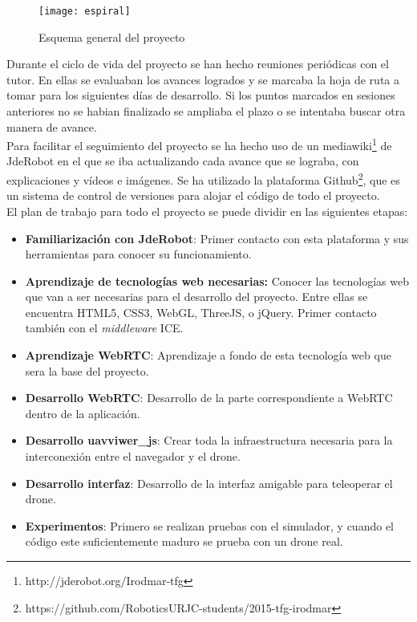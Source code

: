 \begin{figure}[htb]
\centering
\texttt{[image: espiral]}
\caption{Esquema general del proyecto}
\label{fig:planificacion_espiral}
\end{figure}

Durante el ciclo de vida del proyecto se han hecho reuniones periódicas con el tutor. En ellas se evaluaban los avances logrados y se marcaba la hoja de ruta a tomar para los siguientes días de desarrollo. Si los puntos marcados en sesiones anteriores no se habian finalizado se ampliaba el plazo o se intentaba buscar otra manera de avance.\\

Para facilitar el seguimiento del proyecto se ha hecho uso de un mediawiki\footnote{http://jderobot.org/Irodmar-tfg} de JdeRobot en el que se iba actualizando cada avance que se lograba, con explicaciones y vídeos e imágenes. Se ha utilizado la plataforma Github\footnote{https://github.com/RoboticsURJC-students/2015-tfg-irodmar}, que es un sistema de control de versiones para alojar el código de todo el proyecto.\\

El plan de trabajo para todo el proyecto se puede dividir en las siguientes etapas:

\begin{itemize}
\item \textbf{Familiarización con JdeRobot}: Primer contacto con esta plataforma y sus herramientas para conocer su funcionamiento.
\item \textbf{Aprendizaje de tecnologías web necesarias:} Conocer las tecnologías web que van a ser necesarias para el desarrollo del proyecto. Entre ellas se encuentra HTML5, CSS3, WebGL, ThreeJS, o jQuery. Primer contacto también con el \emph{middleware} ICE.
\item \textbf{Aprendizaje WebRTC}: Aprendizaje a fondo de esta tecnología web que sera la base del proyecto.
\item \textbf{Desarrollo WebRTC}: Desarrollo de la parte correspondiente a WebRTC dentro de la aplicación.
\item \textbf{Desarrollo uavviwer\_js}: Crear toda la infraestructura necesaria para la interconexión entre el navegador y el drone.
\item \textbf{Desarrollo interfaz}: Desarrollo de la interfaz amigable para teleoperar el drone.
\item \textbf{Experimentos}: Primero se realizan pruebas con el simulador, y cuando el código este suficientemente maduro se prueba con un drone real.
\end{itemize}






